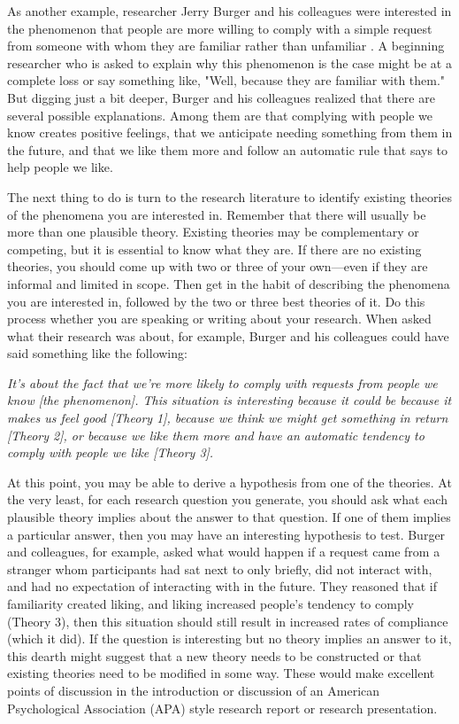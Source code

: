 As another example, researcher Jerry Burger and his colleagues were interested in the phenomenon that people are more willing to comply with a simple request from someone with whom they are familiar rather than unfamiliar \citep{burger_effect_2001}. A beginning researcher who is asked to explain why this phenomenon is the case might be at a complete loss or say something like, "Well, because they are familiar with them." But digging just a bit deeper, Burger and his colleagues realized that there are several possible explanations. Among them are that complying with people we know creates positive feelings, that we anticipate needing something from them in the future, and that we like them more and follow an automatic rule that says to help people we like.

The next thing to do is turn to the research literature to identify existing theories of the phenomena you are interested in. Remember that there will usually be more than one plausible theory. Existing theories may be complementary or competing, but it is essential to know what they are. If there are no existing theories, you should come up with two or three of your own---even if they are informal and limited in scope. Then get in the habit of describing the phenomena you are interested in, followed by the two or three best theories of it. Do this process whether you are speaking or writing about your research. When asked what their research was about, for example, Burger and his colleagues could have said something like the following:

\emph{It's about the fact that we're more likely to comply with requests from people we know [the phenomenon]. This situation is interesting because it could be because it makes us feel good [Theory 1], because we think we might get something in return [Theory 2], or because we like them more and have an automatic tendency to comply with people we like [Theory 3].}

At this point, you may be able to derive a hypothesis from one of the theories. At the very least, for each research question you generate, you should ask what each plausible theory implies about the answer to that question. If one of them implies a particular answer, then you may have an interesting hypothesis to test. Burger and colleagues, for example, asked what would happen if a request came from a stranger whom participants had sat next to only briefly, did not interact with, and had no expectation of interacting with in the future. They reasoned that if familiarity created liking, and liking increased people's tendency to comply (Theory 3), then this situation should still result in increased rates of compliance (which it did). If the question is interesting but no theory implies an answer to it, this dearth might suggest that a new theory needs to be constructed or that existing theories need to be modified in some way. These would make excellent points of discussion in the introduction or discussion of an American Psychological Association (APA) style research report or research presentation.

